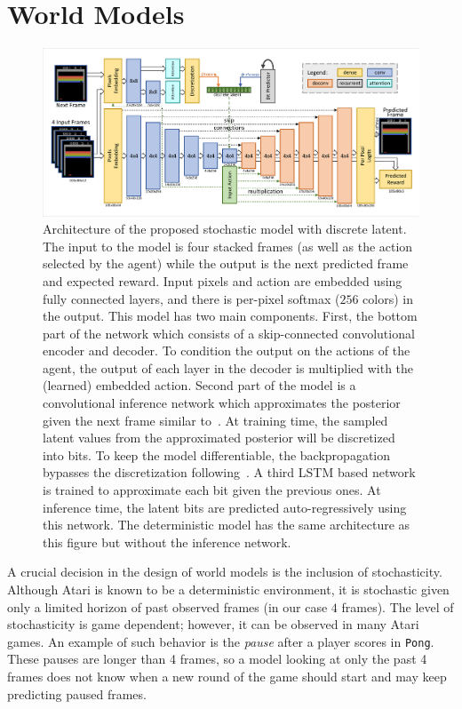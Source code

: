 \section{World Models}
\label{sec:world_models}
\label{sec:architectures}
\label{sec:training}

\begin{figure}[t]
\centering
\includegraphics[width=1.0\textwidth]{figures/model_basic_disc.pdf}
\caption{Architecture of the proposed stochastic model with discrete latent. The input to the model is four stacked frames (as well as the action selected by the agent) while the output is the next predicted frame and expected reward. Input pixels and action are embedded using fully connected layers, and there is per-pixel softmax ($256$ colors) in the output. This model has two main components. First, the bottom part of the network which consists of a skip-connected convolutional encoder and decoder. To condition the output on the actions of the agent, the output of each layer in the decoder is multiplied with the (learned) embedded action. Second part of the model is a convolutional inference network which approximates the posterior given the next frame similar to~\citet{sv2p}. At training time, the sampled latent values from the approximated posterior will be discretized into bits. To keep the model differentiable, the backpropagation bypasses the discretization following~\citet{auto_discrete}. A third LSTM based network is trained to approximate each bit given the previous ones. At inference time, the latent bits are predicted auto-regressively using this network. The deterministic model has the same architecture as this figure but without the inference network.}
\label{fig:full_discrete}
\end{figure}




A crucial decision in the design of world models   %
is the inclusion of stochasticity. Although Atari is known to be a deterministic environment, it is stochastic given only a limited horizon of past observed frames (in our case $4$ frames). The level of stochasticity is game dependent; however, it can be observed in many Atari games. An example of such behavior is the \textit{pause} after a player scores in \texttt{Pong}. These pauses are longer than 4 frames, so a model looking at only the past 4 frames does not know when a new round of the game should start and may keep predicting paused frames.

